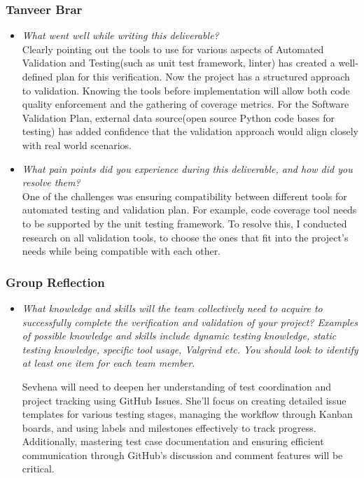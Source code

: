 \documentclass[12pt, titlepage]{article}
\begin{document}
\begin{enumerate}[label={\bf \textcolor{Maroon}{test-SRT-\arabic*}}, wide=0pt, font=\itshape]
\begin{appendices}
\subsubsection*{Tanveer Brar}
\begin{itemize}
    \item \textit{What went well while writing this deliverable?} \\

    Clearly pointing out the tools to use for various aspects of Automated Validation and Testing(such as unit test framework, linter) has created a well-defined plan for this verification. Now the project has a structured approach to validation. Knowing the tools before implementation will allow both code quality enforcement and the gathering of coverage metrics. For the Software Validation Plan, external data source(open source Python code bases for testing) has added confidence that the validation approach would align closely with real world scenarios.

    \item \textit{What pain points did you experience during this deliverable, and how did you resolve them?}\\

    One of the challenges was ensuring compatibility between different tools for automated testing and validation plan. For example, code coverage tool needs to be supported by the unit testing framework. To resolve this, I conducted research on all validation tools, to choose the ones that fit into the project's needs while being compatible with each other.

\end{itemize}

\subsubsection*{Group Reflection}
\begin{itemize}
  \item \textit{What knowledge and skills will the team collectively need to acquire to
  successfully complete the verification and validation of your project?
  Examples of possible knowledge and skills include dynamic testing knowledge,
  static testing knowledge, specific tool usage, Valgrind etc.  You should look to
  identify at least one item for each team member.\\} 
  
  Sevhena will need to deepen her understanding of test coordination and project 
  tracking using GitHub Issues. She’ll focus on creating detailed issue templates 
  for various testing stages, managing the workflow through Kanban boards, and using 
  labels and milestones effectively to track progress. Additionally, mastering test 
  case documentation and ensuring efficient communication through GitHub’s discussion 
  and comment features will be critical.


\end{itemize}
\end{appendices}
\end{enumerate}
\end{document}

